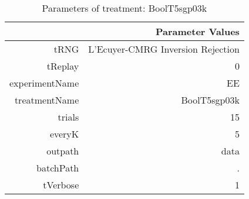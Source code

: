 \begin{table}[ht]
\centering
\begin{tabular}{rr}
  \hline
 & Parameter Values \\ 
  \hline
tRNG & L'Ecuyer-CMRG Inversion Rejection \\ 
  tReplay & 0 \\ 
  experimentName & EE \\ 
  treatmentName & BoolT5sgp03k \\ 
  trials & 15 \\ 
  everyK & 5 \\ 
  outpath & data \\ 
  batchPath & . \\ 
  tVerbose & 1 \\ 
   \hline
\end{tabular}
\caption{ Parameters of treatment: BoolT5sgp03k 
} 
\end{table}
